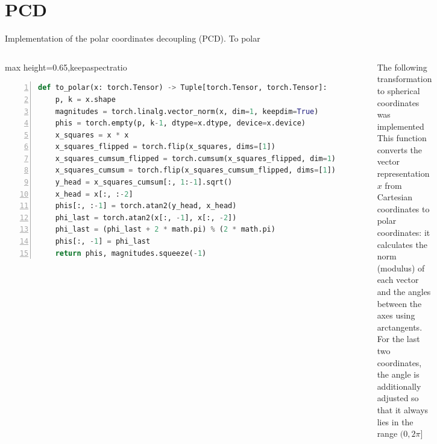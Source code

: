 \section{PCD}


\begin{frame}[fragile]{Implementation of the polar coordinates decoupling (PCD). To polar}
  \begin{columns}[T,onlytextwidth]
      \begin{adjustbox}{max height=0.65\textheight,keepaspectratio}
\begin{lstlisting}[language=Python, basicstyle=\ttfamily\scriptsize, aboveskip=2pt, belowskip=2pt, numbers=left, numberstyle=\tiny, frame=single, breaklines=true]
def to_polar(x: torch.Tensor) -> Tuple[torch.Tensor, torch.Tensor]:
    p, k = x.shape
    magnitudes = torch.linalg.vector_norm(x, dim=1, keepdim=True)
    phis = torch.empty(p, k-1, dtype=x.dtype, device=x.device)
    x_squares = x * x
    x_squares_flipped = torch.flip(x_squares, dims=[1])
    x_squares_cumsum_flipped = torch.cumsum(x_squares_flipped, dim=1)
    x_squares_cumsum = torch.flip(x_squares_cumsum_flipped, dims=[1])
    y_head = x_squares_cumsum[:, 1:-1].sqrt()
    x_head = x[:, :-2]
    phis[:, :-1] = torch.atan2(y_head, x_head)
    phi_last = torch.atan2(x[:, -1], x[:, -2])
    phi_last = (phi_last + 2 * math.pi) % (2 * math.pi)
    phis[:, -1] = phi_last
    return phis, magnitudes.squeeze(-1)
\end{lstlisting}
      \end{adjustbox}
        The following transformation to spherical coordinates was implemented\\
        This function converts the vector representation $x$ from Cartesian coordinates to polar coordinates: it calculates the norm (modulus) of each vector and the angles between the axes using arctangents. For the last two coordinates, the angle is additionally adjusted so that it always lies in the range $(0,2\pi]$
  \end{columns}
\end{frame}
